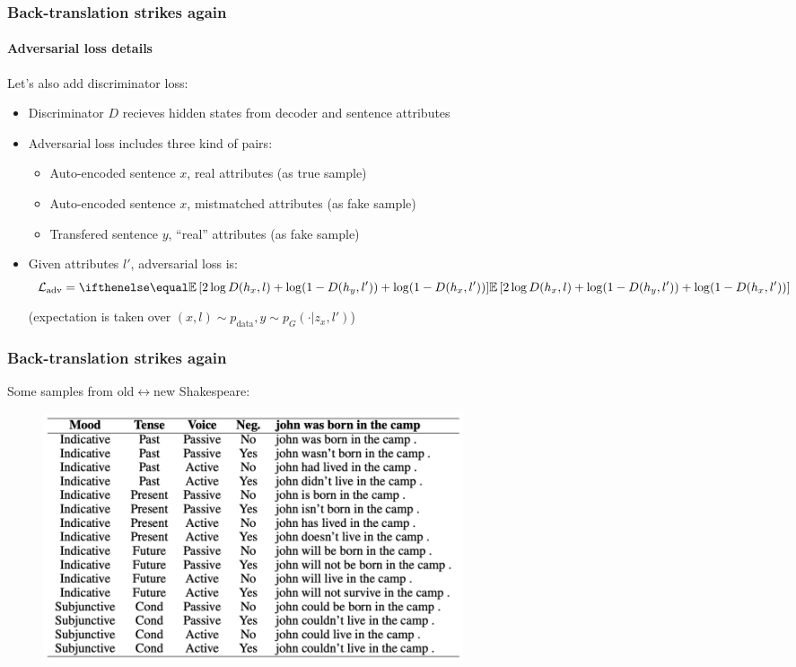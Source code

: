 \documentclass[10pt]{beamer}
\begin{document}
\begin{frame}
\frametitle{Back-translation strikes again}
\framesubtitle{Adversarial loss details}

Let's also add discriminator loss:
\begin{itemize}
    \item Discriminator $D$ recieves hidden states from decoder and sentence attributes
    \item Adversarial loss includes three kind of pairs:
    \begin{itemize}
        \item Auto-encoded sentence $x$, real attributes (as true sample)
        \item Auto-encoded sentence $x$, mistmatched attributes (as fake sample)
        \item Transfered sentence $y$, ``real'' attributes (as fake sample)
    \end{itemize}
    \item Given attributes $l'$, adversarial loss is:
\[
\mathcal{L}_\text{adv} = \expect{2\log D(h_x, l) + \log (1 - D(h_y, l')) + \log(1 - D(h_x, l'))}
\]
(expectation is taken over $(x,l) \sim p_\text{data}, y \sim p_G(\cdot|z_x, l')$)
\end{itemize}
\end{frame}


\begin{frame}
\frametitle{Back-translation strikes again}
Some samples from old$\leftrightarrow$new Shakespeare:
\begin{figure}
\centering
\includegraphics[width=0.6\textwidth]{images/interpolated-bt-samples}
\end{figure}
\end{frame}
\end{document}
